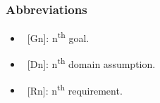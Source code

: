 \subsubsection{Abbreviations}

\begin{itemize}
\item~[Gn]: n\textsuperscript{th} goal.
\item~[Dn]: n\textsuperscript{th} domain assumption.
\item~[Rn]: n\textsuperscript{th} requirement.
\end{itemize}